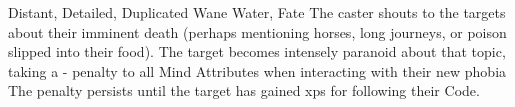   {Distant, Detailed, Duplicated}%
  {Wane}%
  {Water, Fate}%
  {}%
  {The caster shouts to the targets about their imminent death (perhaps mentioning horses, long journeys, or poison slipped into their food).
    The target becomes intensely paranoid about that topic, taking a - penalty to all Mind Attributes when interacting with their new phobia}%
  {
  The penalty persists until the target has gained  \glspl{xp} for following their Code.}

